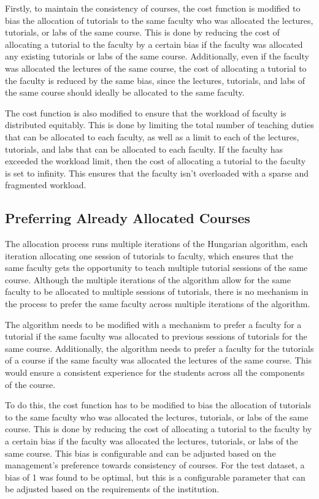 Firstly, to maintain the consistency of courses, the cost function is modified to bias the allocation of tutorials to the same faculty who was allocated the lectures, tutorials, or labs of the same course. This is done by reducing the cost of allocating a tutorial to the faculty by a certain bias if the faculty was allocated any existing tutorials or labs of the same course. Additionally, even if the faculty was allocated the lectures of the same course, the cost of allocating a tutorial to the faculty is reduced by the same bias, since the lectures, tutorials, and labs of the same course should ideally be allocated to the same faculty.

The cost function is also modified to ensure that the workload of faculty is distributed equitably. This is done by limiting the total number of teaching duties that can be allocated to each faculty, as well as a limit to each of the lectures, tutorials, and labs that can be allocated to each faculty. If the faculty has exceeded the workload limit, then the cost of allocating a tutorial to the faculty is set to infinity. This ensures that the faculty isn't overloaded with a sparse and fragmented workload.

\subsection{Preferring Already Allocated Courses}

The allocation process runs multiple iterations of the Hungarian algorithm, each iteration allocating one session of tutorials to faculty, which ensures that the same faculty gets the opportunity to teach multiple tutorial sessions of the same course. Although the multiple iterations of the algorithm allow for the same faculty to be allocated to multiple sessions of tutorials, there is no mechanism in the process to prefer the same faculty across multiple iterations of the algorithm.

The algorithm needs to be modified with a mechanism to prefer a faculty for a tutorial if the same faculty was allocated to previous sessions of tutorials for the same course. Additionally, the algorithm needs to prefer a faculty for the tutorials of a course if the same faculty was allocated the lectures of the same course. This would ensure a consistent experience for the students across all the components of the course.

To do this, the cost function has to be modified to bias the allocation of tutorials to the same faculty who was allocated the lectures, tutorials, or labs of the same course. This is done by reducing the cost of allocating a tutorial to the faculty by a certain bias if the faculty was allocated the lectures, tutorials, or labs of the same course. This bias is configurable and can be adjusted based on the management's preference towards consistency of courses. For the test dataset, a bias of 1 was found to be optimal, but this is a configurable parameter that can be adjusted based on the requirements of the institution.

